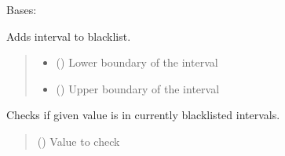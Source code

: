 \documentclass[letterpaper,10pt,english]{sphinxmanual}
\begin{document}
\begin{fulllineitems}
\label{\detokenize{interval_blacklist:interval_blacklist.IntervalBlacklist}}
\pysigstartsignatures
\pysigline
{}
\pysigstopsignatures
\sphinxAtStartPar
Bases: 

\begin{fulllineitems}
\label{\detokenize{interval_blacklist:interval_blacklist.IntervalBlacklist.add_interval}}
\pysigstartsignatures
\pysiglinewithargsret
{}
{\sphinxparamcomma {}}
{}
\pysigstopsignatures
\sphinxAtStartPar
Adds interval to blacklist.
\begin{quote}\begin{description}
\begin{itemize}
\item {} 
\sphinxAtStartPar
{} () \textendash{} Lower boundary of the interval

\item {} 
\sphinxAtStartPar
{} () \textendash{} Upper boundary of the interval

\end{itemize}

\end{description}\end{quote}

\end{fulllineitems}


\begin{fulllineitems}
\label{\detokenize{interval_blacklist:interval_blacklist.IntervalBlacklist.is_blacklisted}}
\pysigstartsignatures
\pysiglinewithargsret
{}
{}
{}
\pysigstopsignatures
\sphinxAtStartPar
Checks if given value is in currently blacklisted intervals.
\begin{quote}\begin{description}
\sphinxAtStartPar
{} () \textendash{} Value to check


\end{description}
\end{quote}
\end{fulllineitems}
\end{fulllineitems}
\end{document}
